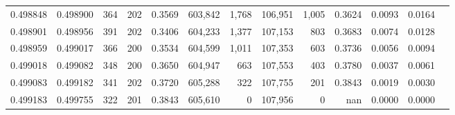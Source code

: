 \begin{tabular}{rrrrrrrrrrrrr}
0.498848 & 0.498900 &   364 & 202 &                                     0.3569 & 603,842 &   1,768 & 106,951 &   1,005 & 0.3624 & 0.0093 & 0.0164 \\
0.498901 & 0.498956 &   391 & 202 &                                     0.3406 & 604,233 &   1,377 & 107,153 &     803 & 0.3683 & 0.0074 & 0.0128 \\
0.498959 & 0.499017 &   366 & 200 &                                     0.3534 & 604,599 &   1,011 & 107,353 &     603 & 0.3736 & 0.0056 & 0.0094 \\
0.499018 & 0.499082 &   348 & 200 &                                     0.3650 & 604,947 &     663 & 107,553 &     403 & 0.3780 & 0.0037 & 0.0061 \\
0.499083 & 0.499182 &   341 & 202 &                                     0.3720 & 605,288 &     322 & 107,755 &     201 & 0.3843 & 0.0019 & 0.0030 \\
0.499183 & 0.499755 &   322 & 201 &                                     0.3843 & 605,610 &       0 & 107,956 &       0 &    nan & 0.0000 & 0.0000 \\
\bottomrule
\end{tabular}
